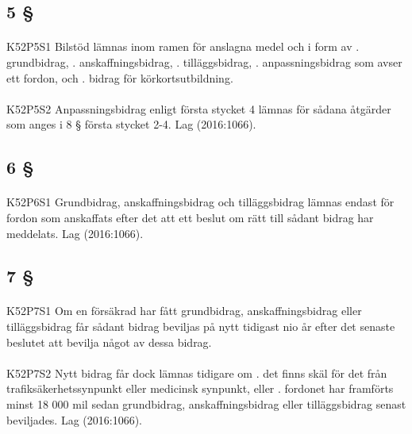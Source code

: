 \documentclass[a4paper,notitlepage,openany,10pt]{book}
\begin{document}
\subsection*{5 §}
\paragraph*{}
{\tiny K52P5S1}
Bilstöd lämnas inom ramen för anslagna medel och i form av
. grundbidrag,
. anskaffningsbidrag,
. tilläggsbidrag,
. anpassningsbidrag som avser ett fordon, och
. bidrag för körkortsutbildning.
\paragraph*{}
{\tiny K52P5S2}
Anpassningsbidrag enligt första stycket 4 lämnas för sådana åtgärder som anges i 8 § första stycket 2-4.
Lag (2016:1066).
\subsection*{6 §}
\paragraph*{}
{\tiny K52P6S1}
Grundbidrag, anskaffningsbidrag och tilläggsbidrag lämnas endast för fordon som anskaffats efter det att ett beslut om rätt till sådant bidrag har meddelats.
Lag (2016:1066).
\subsection*{7 §}
\paragraph*{}
{\tiny K52P7S1}
Om en försäkrad har fått grundbidrag, anskaffningsbidrag eller tilläggsbidrag får sådant bidrag beviljas på nytt tidigast nio år efter det senaste beslutet att bevilja något av dessa bidrag.
\paragraph*{}
{\tiny K52P7S2}
Nytt bidrag får dock lämnas tidigare om
. det finns skäl för det från trafiksäkerhetssynpunkt eller medicinsk synpunkt, eller
. fordonet har framförts minst 18 000 mil sedan grundbidrag, anskaffningsbidrag eller tilläggsbidrag senast beviljades.
Lag (2016:1066).
\end{document}
